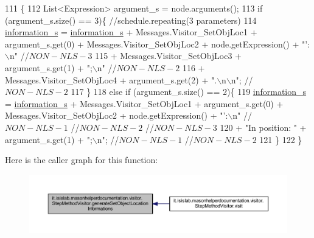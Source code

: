 \begin{DoxyCode}
111                                                                               \{
112         List<Expression> argument\_s = node.arguments();
113         \textcolor{keywordflow}{if} (argument\_s.size() == 3)\{    \textcolor{comment}{//schedule.repeating(3 parameters)}
114             \hyperlink{classit_1_1isislab_1_1masonhelperdocumentation_1_1visitor_1_1_step_method_visitor_adf58f8f5068e330783c3c4bd78080f1a}{information\_s} = \hyperlink{classit_1_1isislab_1_1masonhelperdocumentation_1_1visitor_1_1_step_method_visitor_adf58f8f5068e330783c3c4bd78080f1a}{information\_s} + Messages.Visitor\_SetObjLoc1 + 
      argument\_s.get(0) + Messages.Visitor\_SetObjLoc2 + node.getExpression() + \textcolor{stringliteral}{"': \(\backslash\)n"} \textcolor{comment}{//$NON-NLS-3$}
115                                 + Messages.Visitor\_SetObjLoc3 + argument\_s.get(1) + \textcolor{stringliteral}{";\(\backslash\)n"} \textcolor{comment}{//$NON-NLS-2$}
116                                 + Messages.Visitor\_SetObjLoc4 + argument\_s.get(2) + \textcolor{stringliteral}{".\(\backslash\)n\(\backslash\)n"}; \textcolor{comment}{//$NON-NLS-2$}
117         \}
118         \textcolor{keywordflow}{else} \textcolor{keywordflow}{if} (argument\_s.size() == 2)\{
119             \hyperlink{classit_1_1isislab_1_1masonhelperdocumentation_1_1visitor_1_1_step_method_visitor_adf58f8f5068e330783c3c4bd78080f1a}{information\_s} = \hyperlink{classit_1_1isislab_1_1masonhelperdocumentation_1_1visitor_1_1_step_method_visitor_adf58f8f5068e330783c3c4bd78080f1a}{information\_s} + Messages.Visitor\_SetObjLoc1 + 
      argument\_s.get(0) + Messages.Visitor\_SetObjLoc2 + node.getExpression() + \textcolor{stringliteral}{"':\(\backslash\)n"} \textcolor{comment}{//$NON-NLS-1$ //$NON-NLS-2$
       //$NON-NLS-3$}
120                     + \textcolor{stringliteral}{"In position: "} + argument\_s.get(1) + \textcolor{stringliteral}{";\(\backslash\)n"}; \textcolor{comment}{//$NON-NLS-1$ //$NON-NLS-2$}
121         \}
122     \}
\end{DoxyCode}


Here is the caller graph for this function\-:
\nopagebreak
\begin{figure}[H]
\begin{center}
\leavevmode
\includegraphics[width=350pt]{classit_1_1isislab_1_1masonhelperdocumentation_1_1visitor_1_1_step_method_visitor_a6da0e3fe57c639de2c827068e2e57efc_icgraph}
\end{center}
\end{figure}


